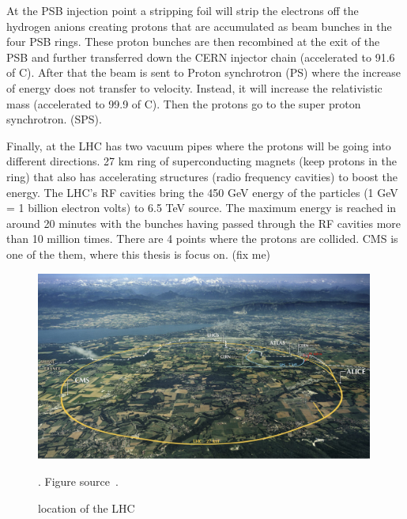  At the PSB injection point a stripping foil will strip the electrons off the hydrogen anions creating protons that are accumulated as beam bunches in the four PSB rings. These proton bunches are then recombined at the exit of the PSB and further transferred down the CERN injector chain (accelerated to 91.6 of C). After that the beam is sent to Proton synchrotron (PS) where the increase of energy does not transfer to velocity. Instead, it will increase the relativistic mass (accelerated to 99.9 of C). Then the protons go to the super proton synchrotron. (SPS).

Finally, at the LHC has two vacuum pipes where the protons will be going into different directions. 27 km ring of superconducting magnets (keep protons in the ring) that also has accelerating structures (radio frequency cavities) to boost the energy. The LHC’s RF cavities bring the 450 GeV energy of the particles (1 GeV = 1 billion electron volts) to 6.5 TeV source. The maximum energy is reached in around 20 minutes with the bunches having passed through the RF cavities more than 10 million times. There are 4 points where the protons are collided. CMS is one of the them, where this thesis is focus on. (fix me) 

\begin{figure}[t!]
\centering
\includegraphics[width=0.99\textwidth]{figures/LHC_location.png}
\caption[location of the LHC]{location of the LHC}. Figure source~\cite{SMtable}.
\label{fig:LHC_location}
\end{figure}

